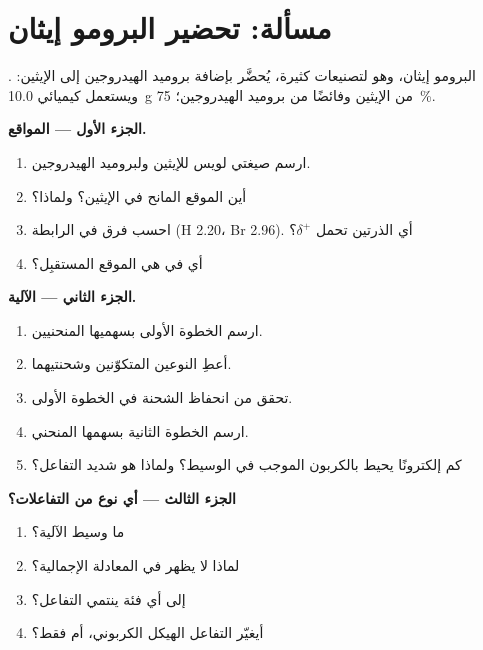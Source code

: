 \section{مسألة: تحضير البرومو إيثان}

\begin{problem}
\label{pb:g12:curly-arrows:1}
البرومو إيثان، وهو  لتصنيعات كثيرة، يُحضَّر بإضافة
بروميد الهيدروجين إلى الإيثين: . ويستعمل كيميائي
\qty{10.0}{g} من الإيثين وفائضًا من بروميد الهيدروجين؛ 
\qty{75}{\percent}.

\medskip
\noindent\textbf{الجزء الأول --- المواقع.}
\begin{enumerate}
  \item ارسم صيغتي لويس للإيثين ولبروميد الهيدروجين.
  \item أين الموقع المانح في الإيثين؟ ولماذا؟
  \item احسب فرق  في الرابطة 
        (H 2.20، Br 2.96). أي الذرتين تحمل $\delta^+$؟
  \item أي  في  هي الموقع المستقبِل؟
\end{enumerate}

\medskip
\noindent\textbf{الجزء الثاني --- الآلية.}
\begin{enumerate}[resume]
  \item ارسم الخطوة الأولى بسهميها المنحنيين.
  \item أعطِ النوعين المتكوّنين وشحنتيهما.
  \item تحقق من انحفاظ الشحنة في الخطوة الأولى.
  \item ارسم الخطوة الثانية بسهمها المنحني.
  \item كم إلكترونًا يحيط بالكربون الموجب في
        الوسيط؟ ولماذا هو شديد التفاعل؟
\end{enumerate}

\medskip
\noindent\textbf{الجزء الثالث --- أي نوع من التفاعلات؟}
\begin{enumerate}[resume]
  \item ما وسيط الآلية؟
  \item لماذا لا يظهر في المعادلة الإجمالية؟
  \item إلى أي فئة ينتمي التفاعل؟
  \item أيغيّر التفاعل الهيكل الكربوني، أم  فقط؟
\end{enumerate}


\end{problem}
